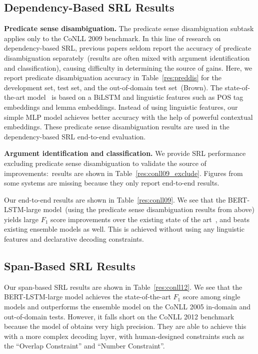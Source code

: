 \documentclass[11pt,a4paper]{article}
\begin{document}
\subsection{Dependency-Based SRL Results}


\noindent \textbf{Predicate sense disambiguation.} 
The predicate sense disambiguation subtask applies only to the CoNLL 2009 benchmark.
In this line of research on dependency-based SRL, previous papers seldom report the accuracy of predicate disambiguation separately~(results are often mixed with argument identification and classification), causing difficulty in determining the source of gains. 
Here, we report predicate disambiguation accuracy in Table~\ref{res:preddis} for the development set, test set, and the out-of-domain test set~(Brown). 
The state-of-the-art model~\cite{he2018syntax} is based on a BiLSTM and linguistic features such as POS tag embeddings and lemma embeddings. 
Instead of using linguistic features, our simple MLP model achieves better accuracy with the help of powerful contextual embeddings. 
These predicate sense disambiguation results are used in the dependency-based SRL end-to-end evaluation.

\smallskip \noindent \textbf{Argument identification and classification.} 
We provide SRL performance excluding predicate sense disambiguation to validate the source of improvements:\ results are shown in Table~\ref{res:conll09_exclude}.
Figures from some systems are missing because they only report end-to-end results.

Our end-to-end results are shown in Table~\ref{res:conll09}.
We see that the BERT-LSTM-large model~(using the predicate sense disambiguation results from above) yields large $F_1$ score improvements over the existing state of the art~\cite{li2019dependency}, and beats existing ensemble models as well.
This is achieved without using any linguistic features and declarative decoding constraints.


\subsection{Span-Based SRL Results}

Our span-based SRL results are shown in Table~\ref{res:conll12}. 
We see that the BERT-LSTM-large model achieves the state-of-the-art $F_1$ score among single models and outperforms the \citet{ouchi2018span} ensemble model on the CoNLL 2005 in-domain and out-of-domain tests. 
However, it falls short on the CoNLL 2012 benchmark because the model of \citet{ouchi2018span} obtains very high precision. 
They are able to achieve this with a more complex decoding layer, with human-designed constraints such as the ``Overlap Constraint'' and ``Number Constraint''.
\end{document}
